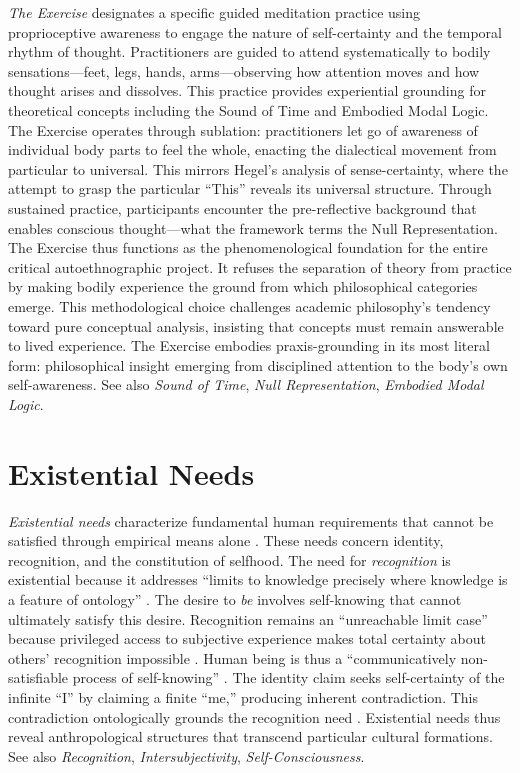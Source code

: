 \documentclass{book}
\begin{document}
\textit{The Exercise} designates a specific guided meditation practice using proprioceptive awareness to engage the nature of self-certainty and the temporal rhythm of thought. Practitioners are guided to attend systematically to bodily sensations---feet, legs, hands, arms---observing how attention moves and how thought arises and dissolves. This practice provides experiential grounding for theoretical concepts including the Sound of Time and Embodied Modal Logic. The Exercise operates through sublation: practitioners let go of awareness of individual body parts to feel the whole, enacting the dialectical movement from particular to universal. This mirrors Hegel's analysis of sense-certainty, where the attempt to grasp the particular ``This'' reveals its universal structure. Through sustained practice, participants encounter the pre-reflective background that enables conscious thought---what the framework terms the Null Representation. The Exercise thus functions as the phenomenological foundation for the entire critical autoethnographic project. It refuses the separation of theory from practice by making bodily experience the ground from which philosophical categories emerge. This methodological choice challenges academic philosophy's tendency toward pure conceptual analysis, insisting that concepts must remain answerable to lived experience. The Exercise embodies praxis-grounding in its most literal form: philosophical insight emerging from disciplined attention to the body's own self-awareness. See also \textit{Sound of Time}, \textit{Null Representation}, \textit{Embodied Modal Logic}.

\section{Existential Needs}

\textit{Existential needs} characterize fundamental human requirements that cannot be satisfied through empirical means alone \parencite{Carspecken1999}. These needs concern identity, recognition, and the constitution of selfhood. The need for \textit{recognition} is existential because it addresses ``limits to knowledge precisely where knowledge is a feature of ontology'' \parencite{carspecken_limits_2016}. The desire to \textit{be} involves self-knowing that cannot ultimately satisfy this desire. Recognition remains an ``unreachable limit case'' because privileged access to subjective experience makes total certainty about others' recognition impossible \parencite{Carspecken1999}. Human being is thus a ``communicatively non-satisfiable process of self-knowing'' \parencite{carspecken_limits_2016}. The identity claim seeks self-certainty of the infinite ``I'' by claiming a finite ``me,'' producing inherent contradiction. This contradiction ontologically grounds the recognition need \parencite{Carspecken1999}. Existential needs thus reveal anthropological structures that transcend particular cultural formations. See also \textit{Recognition}, \textit{Intersubjectivity}, \textit{Self-Consciousness}.
\end{document}
